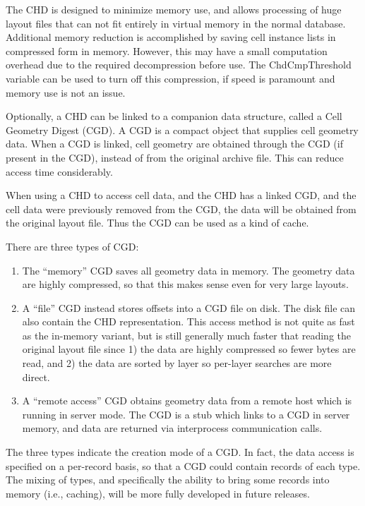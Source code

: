 The CHD is designed to minimize memory use, and allows processing of
huge layout files that can not fit entirely in virtual memory in the
normal database.  Additional memory reduction is accomplished by
saving cell instance lists in compressed form in memory.  However,
this may have a small computation overhead due to the required
decompression before use.  The {\et ChdCmpThreshold} variable can be
used to turn off this compression, if speed is paramount and memory
use is not an issue.

Optionally, a CHD can be linked to a companion data structure, called
a Cell Geometry Digest (CGD).  A CGD is a compact object that supplies
cell geometry data.  When a CGD is linked, cell geometry are obtained
through the CGD (if present in the CGD), instead of from the original
archive file.  This can reduce access time considerably.

When using a CHD to access cell data, and the CHD has a linked CGD,
and the cell data were previously removed from the CGD, the data will
be obtained from the original layout file.  Thus the CGD can be used
as a kind of cache.

There are three types of CGD:
\begin{enumerate}
\item{The ``memory'' CGD saves all geometry data in memory.  The
 geometry data are highly compressed, so that this makes sense even
 for very large layouts.}
\item{A ``file'' CGD instead stores offsets into a CGD file on disk. 
 The disk file can also contain the CHD representation.  This access
 method is not quite as fast as the in-memory variant, but is still
 generally much faster that reading the original layout file since 1)
 the data are highly compressed so fewer bytes are read, and 2) the
 data are sorted by layer so per-layer searches are more direct.}
\item{A ``remote access'' CGD obtains geometry data from a remote host
 which is running {\Xic} in server mode.  The CGD is a stub which
 links to a CGD in server memory, and data are returned via
 interprocess communication calls.}
\end{enumerate}

The three types indicate the creation mode of a CGD.  In fact, the
data access is specified on a per-record basis, so that a CGD could
contain records of each type.  The mixing of types, and specifically
the ability to bring some records into memory (i.e., caching), will be
more fully developed in future releases.

